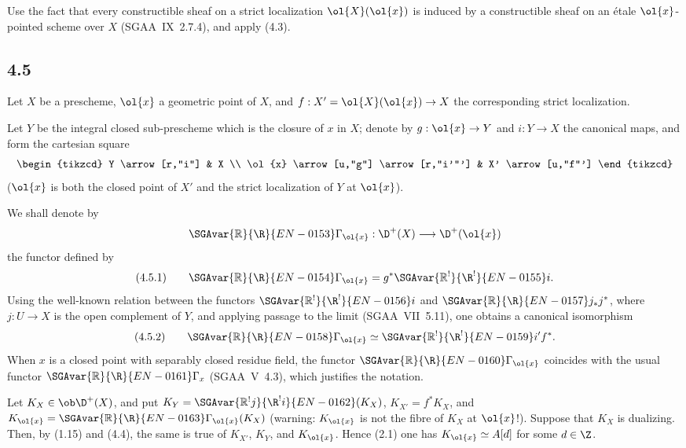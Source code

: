 \begin{prooftext}[Proof]
Use the fact that every constructible sheaf on a strict localization $\ol{X}(\ol{x})$ is induced by a constructible sheaf on an étale $\ol{x}$-pointed scheme over $X$ (SGAA~IX~2.7.4), and apply (4.3).
\end{prooftext}

\subsection*{4.5}
Let $X$ be a prescheme, $\ol{x}$ a geometric point of $X$, and $f:X'=\ol{X}(\ol{x})\to X$ the corresponding strict localization.

Let $Y$ be the integral closed sub-prescheme which is the closure of $x$ in $X$; denote by $g:\ol{x}\to Y$ and $i:Y\to X$ the canonical maps, and form the cartesian square
\[
\begin{tikzcd}
Y \arrow[r,"i"] & X \\
\ol{x} \arrow[u,"g"] \arrow[r,"i'"'] & X' \arrow[u,"f"']
\end{tikzcd}
\]
($\ol{x}$ is both the closed point of $X'$ and the strict localization of $Y$ at $\ol{x}$).

We shall denote by
\[
\SGAvar{\mathbb{R}}{\R}{EN-0153}\Gamma_{\ol{x}}:\D^+(X)\longrightarrow \D^+(\ol{x})
\]
the functor defined by
\[
(4.5.1)\qquad \SGAvar{\mathbb{R}}{\R}{EN-0154}\Gamma_{\ol{x}}=g^*\SGAvar{\mathbb{R}^{!}}{\R^{!}}{EN-0155}i.
\]
Using the well-known relation between the functors $\SGAvar{\mathbb{R}^{!}}{\R^{!}}{EN-0156}i$ and $\SGAvar{\mathbb{R}}{\R}{EN-0157} j_*j^*$, where $j:U\to X$ is the open complement of $Y$, and applying passage to the limit (SGAA~VII~5.11), one obtains a canonical isomorphism
\[
(4.5.2)\qquad \SGAvar{\mathbb{R}}{\R}{EN-0158}\Gamma_{\ol{x}}\simeq\SGAvar{\mathbb{R}^{!}}{\R^{!}}{EN-0159}i' f^*.
\]
When $x$ is a closed point with separably closed residue field, the functor $\SGAvar{\mathbb{R}}{\R}{EN-0160}\Gamma_{\ol{x}}$ coincides with the usual functor $\SGAvar{\mathbb{R}}{\R}{EN-0161}\Gamma_x$ (SGAA~V~4.3), which justifies the notation.

Let $K_X\in\ob\D^+(X)$, and put $K_Y=\SGAvar{\mathbb{R}^{!}j}{\R^{!}i}{EN-0162}(K_X)$, $K_{X'}=f^*K_X$, and $K_{\ol{x}}=\SGAvar{\mathbb{R}}{\R}{EN-0163}\Gamma_{\ol{x}}(K_X)$ (warning: $K_{\ol{x}}$ is not the fibre of $K_X$ at $\ol{x}$!). Suppose that $K_X$ is dualizing. Then, by (1.15) and (4.4), the same is true of $K_{X'}$, $K_Y$, and $K_{\ol{x}}$. Hence (2.1) one has $K_{\ol{x}}\simeq A[d]$ for some $d\in\Z$.

